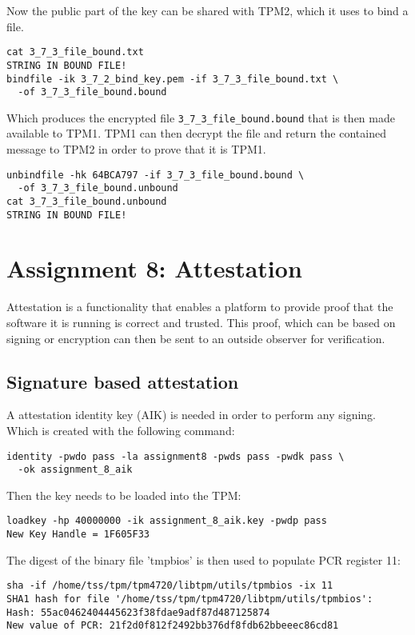 \documentclass[10pt]{article}
\begin{document}
      Now the public part of the key can be shared with TPM2, which it uses 
      to bind a file.

\begin{verbatim}
cat 3_7_3_file_bound.txt
STRING IN BOUND FILE!
bindfile -ik 3_7_2_bind_key.pem -if 3_7_3_file_bound.txt \
  -of 3_7_3_file_bound.bound
\end{verbatim}

      Which produces the encrypted file \texttt{3\_7\_3\_file\_bound.bound}
      that is then made available to TPM1. TPM1 can then decrypt the file and
      return the contained message to TPM2 in order to prove that it is TPM1.

\begin{verbatim}
unbindfile -hk 64BCA797 -if 3_7_3_file_bound.bound \
  -of 3_7_3_file_bound.unbound
cat 3_7_3_file_bound.unbound
STRING IN BOUND FILE!
\end{verbatim}

\section{Assignment 8: Attestation}

  Attestation is a functionality that enables a platform to provide proof that
  the software it is running is correct and trusted. This proof, which can be
  based on signing or encryption can then be sent to an outside observer for
  verification.

  \subsection{Signature based attestation}

    A attestation identity key (AIK) is needed in order to perform any signing.
    Which is created with the following command:
\begin{verbatim}
identity -pwdo pass -la assignment8 -pwds pass -pwdk pass \
  -ok assignment_8_aik
\end{verbatim}

    Then the key needs to be loaded into the TPM:

\begin{verbatim}
loadkey -hp 40000000 -ik assignment_8_aik.key -pwdp pass
New Key Handle = 1F605F33
\end{verbatim}

    The digest of the binary file 'tmpbios' is then used to populate PCR
    register 11:

\begin{verbatim}
sha -if /home/tss/tpm/tpm4720/libtpm/utils/tpmbios -ix 11
SHA1 hash for file '/home/tss/tpm/tpm4720/libtpm/utils/tpmbios':
Hash: 55ac0462404445623f38fdae9adf87d487125874
New value of PCR: 21f2d0f812f2492bb376df8fdb62bbeeec86cd81
\end{verbatim}
\end{document}
